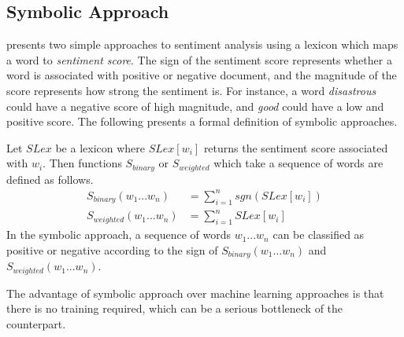 \subsection{Symbolic Approach}
\cite{wilson2005recognizing} presents two simple approaches to sentiment analysis using a lexicon which maps a word to {\em sentiment score}. The sign of the sentiment score represents whether a word is associated with positive or negative document, and the magnitude of the score represents how strong the sentiment is. For instance, a word {\em disastrous} could have a negative score of high magnitude, and {\em good} could have a low and positive score. The following presents a formal definition of symbolic approaches.
\begin{definition}
\label{def:1}
Let $SLex$ be a lexicon where $SLex[w_i]$ returns the sentiment score associated with $w_i$. Then functions $S_{binary}$ or $S_{weighted}$ which take a sequence of words are defined as follows.
\begin{align*}
S_{binary}(w_1 ... w_n) &= \sum\limits_{i=1}^{n}sgn(SLex[w_i])\\
S_{weighted}(w_1 ... w_n) &= \sum\limits_{i=1}^{n}SLex[w_i]
\end{align*}
In the symbolic approach, a sequence of words $w_1 ... w_n$ can be classified as positive or negative according to the sign of $S_{binary}(w_1 ... w_n)$ and $S_{weighted}(w_1 ... w_n)$. 
\end{definition}
The advantage of symbolic approach over machine learning approaches is that there is no training required, which can be a serious bottleneck of the counterpart.
